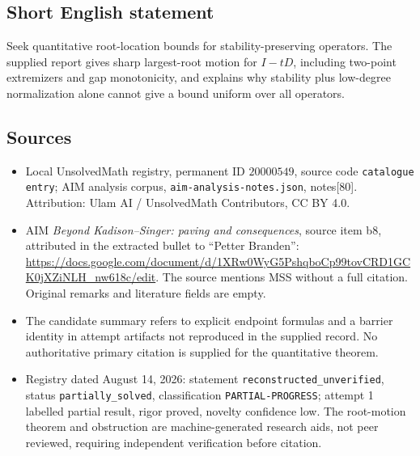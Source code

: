 \documentclass[11pt]{article}
\begin{document}
\subsection{Short English statement}
Seek quantitative root-location bounds for stability-preserving operators. The supplied report gives sharp largest-root motion for \(I-tD\), including two-point extremizers and gap monotonicity, and explains why stability plus low-degree normalization alone cannot give a bound uniform over all operators.
\subsection{Sources}
\begin{itemize}
\item Local UnsolvedMath registry, permanent ID \(20000549\), source code \texttt{catalogue entry}; AIM analysis corpus, \texttt{aim-analysis-notes.json}, notes[80]. Attribution: Ulam AI / UnsolvedMath Contributors, CC BY 4.0.
\item AIM \emph{Beyond Kadison--Singer: paving and consequences}, source item b8, attributed in the extracted bullet to ``Petter Branden'': \url{https://docs.google.com/document/d/1XRw0WyG5PshqboCp99tovCRD1GCK0jXZiNLH_nw618c/edit}. The source mentions MSS without a full citation. Original remarks and literature fields are empty.
\item The candidate summary refers to explicit endpoint formulas and a barrier identity in attempt artifacts not reproduced in the supplied record. No authoritative primary citation is supplied for the quantitative theorem.
\item Registry dated August 14, 2026: statement \texttt{reconstructed\_unverified}, status \texttt{partially\_solved}, classification \texttt{PARTIAL-PROGRESS}; attempt 1 labelled partial result, rigor proved, novelty confidence low. The root-motion theorem and obstruction are machine-generated research aids, not peer reviewed, requiring independent verification before citation.
\end{itemize}
\end{document}
